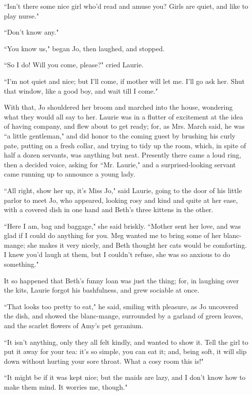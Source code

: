 ``Isn't there some nice girl who'd read
and amuse you? Girls are quiet, and like to play nurse."

``Don't know any."

``You know us," began Jo, then laughed, and stopped.

``So I do! Will you come, please?" cried Laurie.

``I'm not quiet and nice; but I'll come,
if mother will let me. I'll go ask her. Shut that
window, like a good boy, and wait till I come."

With that, Jo shouldered her broom and marched into the house, wondering
what they would all say to her. Laurie was in a flutter of excitement at
the idea of having company, and flew about to get ready; for, as Mrs.
March said, he was ``a little gentleman," and did honor to the coming
guest by brushing his curly pate, putting on a fresh collar, and trying
to tidy up the room, which, in spite of half a dozen servants, was
anything but neat. Presently there came a loud ring, then a decided
voice, asking for ``Mr. Laurie," and a surprised-looking servant came
running up to announce a young lady.

``All right, show her up, it's Miss Jo," said Laurie,
going to the door of his little parlor to meet Jo, who appeared, looking
rosy and kind and quite at her ease, with a covered dish in one hand and
Beth's three kittens in the other.

``Here I am, bag and baggage," she said briskly. ``Mother sent her love,
and was glad if I could do anything for you. Meg wanted me to bring some
of her blanc-mange; she makes it very nicely, and Beth thought her cats
would be comforting. I knew you'd laugh at them, but I
couldn't refuse, she was so anxious to do something."

It so happened that Beth's funny loan was just the
thing; for, in laughing over the kits, Laurie forgot his bashfulness,
and grew sociable at once.

``That looks too pretty to eat," he said, smiling with pleasure, as Jo
uncovered the dish, and showed the blanc-mange, surrounded by a garland
of green leaves, and the scarlet flowers of Amy's pet
geranium.

``It isn't anything, only they all felt kindly, and
wanted to show it. Tell the girl to put it away for your tea:
it's so simple, you can eat it; and, being soft, it will
slip down without hurting your sore throat. What a cosy room this is!"

``It might be if it was kept nice; but the maids are lazy, and I
don't know how to make them mind. It worries me,
though."

